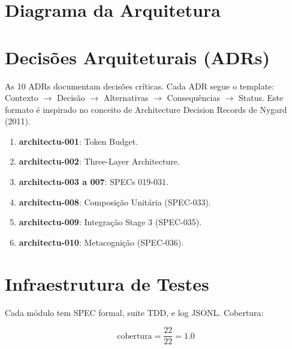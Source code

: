 \section{Diagrama da Arquitetura}



\section{Decisões Arquiteturais (ADRs)}

As 10 ADRs documentam decisões críticas. Cada ADR segue o template: Contexto $\rightarrow$ Decisão $\rightarrow$ Alternativas $\rightarrow$ Consequências $\rightarrow$ Status. Este formato é inspirado no conceito de Architecture Decision Records de Nygard (2011).

\begin{enumerate}
    \item \textbf{architectu-001}: Token Budget.
    \item \textbf{architectu-002}: Three-Layer Architecture.
    \item \textbf{architectu-003 a 007}: SPECs 019-031.
    \item \textbf{architectu-008}: Composição Unitária (SPEC-033). 
    \item \textbf{architectu-009}: Integração Stage 3 (SPEC-035).
    \item \textbf{architectu-010}: Metacognição (SPEC-036). 
\end{enumerate}

\section{Infraestrutura de Testes}

Cada módulo tem SPEC formal, suite TDD, e log JSONL. Cobertura:

\begin{equation}
\text{cobertura} = \frac{22}{22} = 1.0
\label{eq:coverage}
\end{equation}

